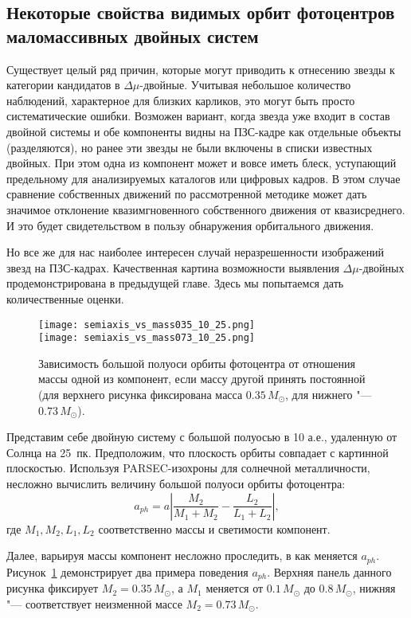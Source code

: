 \subsection{Некоторые свойства видимых орбит фотоцентров маломассивных двойных систем}\label{subsec:ch1/sect2/sub1}
Существует целый ряд причин, которые могут приводить к отнесению звезды к категории кандидатов в $\Delta\mu$-двойные. Учитывая небольшое количество наблюдений, характерное для близких карликов, это могут быть просто систематические ошибки. Возможен вариант, когда звезда уже входит в состав двойной системы и обе компоненты видны на ПЗС-кадре как отдельные объекты (разделяются), но ранее эти звезды не были включены в списки известных двойных. При этом одна из компонент может и вовсе иметь блеск, уступающий предельному для  анализируемых каталогов или цифровых кадров. В этом случае сравнение собственных движений по рассмотренной методике может дать значимое отклонение квазимгновенного  собственного движения от квазисреднего. И это будет свидетельством в пользу обнаружения орбитального движения.

Но все же для нас наиболее интересен случай неразрешенности изображений звезд на ПЗС-кадрах. Качественная картина возможности выявления $\Delta\mu$-двойных продемонстрирована в предыдущей главе. Здесь мы попытаемся дать количественные оценки.

\begin{figure}[pt]\label{fig:semiaxis1}
\centering
\texttt{[image: semiaxis\_vs\_mass035\_10\_25.png]}\\
\texttt{[image: semiaxis\_vs\_mass073\_10\_25.png]}
\caption{Зависимость большой полуоси орбиты фотоцентра от отношения массы одной из компонент, если массу другой принять постоянной (для верхнего рисунка фиксирована масса $0.35\,M_\odot$, для нижнего "--- $0.73\,M_\odot$).}
\end{figure}

Представим себе двойную систему с большой полуосью в 10 а.е., удаленную от Солнца на 25~пк. Предположим, что плоскость орбиты совпадает с картинной плоскостью. Используя PARSEC-изохроны для солнечной металличности, несложно вычислить величину большой полуоси орбиты фотоцентра:
\begin{equation}
\label{eq:Photocenter}
 a_{ph}=a\left| \frac{M_2}{M_1+M_2} - \frac{L_2}{L_1+L_2} \right|,
\end{equation}
где $M_1,M_2,L_1,L_2$ соответственно массы и светимости компонент.

Далее, варьируя массы компонент несложно проследить, в как меняется $a_{ph}$. Рисунок~\ref{fig:semiaxis1} демонстрирует два примера поведения $a_{ph}$. Верхняя панель данного рисунка фиксирует $M_2 = 0.35\,M_\odot$, а $M_1$ меняется от $0.1\,M_\odot$ до $0.8\,M_\odot$, нижняя "--- соответствует неизменной массе $M_2 = 0.73\,M_\odot$.

